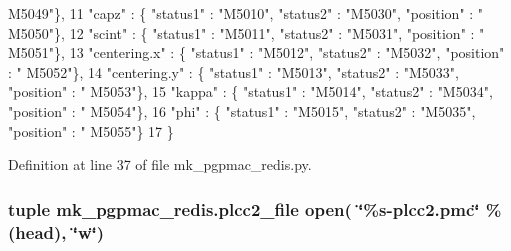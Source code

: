 \begin{DoxyCode}
{      M5049"}\},
11     \textcolor{stringliteral}{"capz"}        : \{ \textcolor{stringliteral}{"status1"} : \textcolor{stringliteral}{"M5010"}, \textcolor{stringliteral}{"status2"} : \textcolor{stringliteral}{"M5030"}, \textcolor{stringliteral}{"position"} : \textcolor{stringliteral}{"
      M5050"}\},
12     \textcolor{stringliteral}{"scint"}       : \{ \textcolor{stringliteral}{"status1"} : \textcolor{stringliteral}{"M5011"}, \textcolor{stringliteral}{"status2"} : \textcolor{stringliteral}{"M5031"}, \textcolor{stringliteral}{"position"} : \textcolor{stringliteral}{"
      M5051"}\},
13     \textcolor{stringliteral}{"centering.x"} : \{ \textcolor{stringliteral}{"status1"} : \textcolor{stringliteral}{"M5012"}, \textcolor{stringliteral}{"status2"} : \textcolor{stringliteral}{"M5032"}, \textcolor{stringliteral}{"position"} : \textcolor{stringliteral}{"
      M5052"}\},
14     \textcolor{stringliteral}{"centering.y"} : \{ \textcolor{stringliteral}{"status1"} : \textcolor{stringliteral}{"M5013"}, \textcolor{stringliteral}{"status2"} : \textcolor{stringliteral}{"M5033"}, \textcolor{stringliteral}{"position"} : \textcolor{stringliteral}{"
      M5053"}\},
15     \textcolor{stringliteral}{"kappa"}       : \{ \textcolor{stringliteral}{"status1"} : \textcolor{stringliteral}{"M5014"}, \textcolor{stringliteral}{"status2"} : \textcolor{stringliteral}{"M5034"}, \textcolor{stringliteral}{"position"} : \textcolor{stringliteral}{"
      M5054"}\},
16     \textcolor{stringliteral}{"phi"}         : \{ \textcolor{stringliteral}{"status1"} : \textcolor{stringliteral}{"M5015"}, \textcolor{stringliteral}{"status2"} : \textcolor{stringliteral}{"M5035"}, \textcolor{stringliteral}{"position"} : \textcolor{stringliteral}{"
      M5055"}\}
17 \}
\end{DoxyCode}


Definition at line 37 of file mk\-\_\-pgpmac\-\_\-redis.\-py.

\hypertarget{namespacemk__pgpmac__redis_a950307aae727f0afc8120ab03445b411}{
\subsubsection[{plcc2\-\_\-file}]{\setlength{\rightskip}{0pt plus 5cm}tuple mk\-\_\-pgpmac\-\_\-redis.\-plcc2\-\_\-file open( \char`\"{}\%s-\/plcc2.\-pmc\char`\"{} \% (head), \char`\"{}w\char`\"{})}}\label{namespacemk__pgpmac__redis_a950307aae727f0afc8120ab03445b411}



